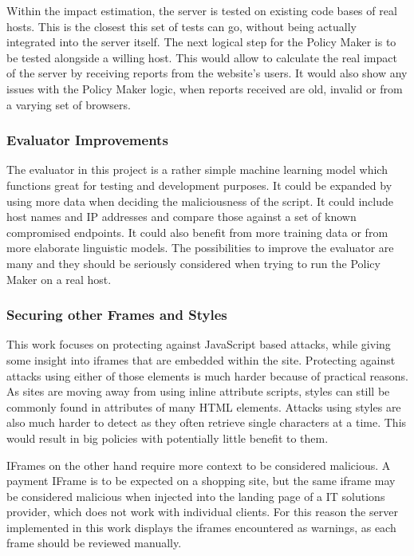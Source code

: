 Within the impact estimation, the server is tested on existing code bases of real hosts.
This is the closest this set of tests can go, without being actually integrated into the server itself.
The next logical step for the Policy Maker is to be tested alongside a willing host.
This would allow to calculate the real impact of the server by receiving reports from the website's users.
It would also show any issues with the Policy Maker logic, when reports received are old, invalid or from a varying set of browsers.

\subsubsection{Evaluator Improvements}

The evaluator in this project is a rather simple machine learning model which functions great for testing and development purposes.
It could be expanded by using more data when deciding the maliciousness of the script.
It could include host names and IP addresses and compare those against a set of known compromised endpoints.
It could also benefit from more training data or from more elaborate linguistic models.
The possibilities to improve the evaluator are many and they should be seriously considered when trying to run the Policy Maker on a real host.

\subsubsection{Securing other Frames and Styles}

This work focuses on protecting against JavaScript based attacks, while giving some insight into iframes that are embedded within the site.
Protecting against attacks using either of those elements is much harder because of practical reasons.
As sites are moving away from using inline attribute scripts, styles can still be commonly found in attributes of many HTML elements.
Attacks using styles are also much harder to detect as they often retrieve single characters at a time.
This would result in big policies with potentially little benefit to them.

IFrames on the other hand require more context to be considered malicious.
A payment IFrame is to be expected on a shopping site, but the same iframe may be considered malicious when injected into the landing page of a IT solutions provider, which does not work with individual clients.
For this reason the server implemented in this work displays the iframes encountered as warnings, as each frame should be reviewed manually.

